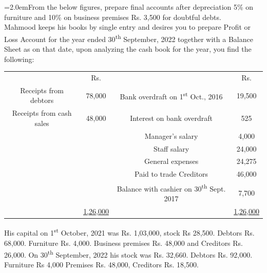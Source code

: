 \documentclass[11pt,a4paper]{article}
\newcommand{\lqn}[2]{\Needspace{6\baselineskip}\par\medskip\noindent\hangindent=2.0em\hangafter=1\makebox[2.0em][l]{\textbf{#1.}}#2\par}
\begin{document}
\lqn{13}{From the below figures, prepare final accounts after depreciation 5\% on furniture and 10\% on business premises Rs. 3,500 for doubtful debts.\\
Mahmood keeps his books by single entry and desires you to prepare Profit or Loss Account for the year ended 30\textsuperscript{th}  September, 2022 together with a Balance Sheet as on that date, upon analyzing the cash book for the year, you find the following:\par
\par\smallskip\noindent\hspace*{1.2em}\begin{tabular}{|cccc|}
\hline
 & Rs. &  & Rs. \\
Receipts from debtors & 78,000 & Bank overdraft on 1\textsuperscript{st}  Oct., 2016 & 19,500 \\
Receipts from cash sales & 48,000 & Interest on bank overdraft & 525 \\
 &  & Manager’s salary & 4,000 \\
 &  & Staff salary & 24,000 \\
 &  & General expenses & 24,275 \\
 &  & Paid to trade Creditors & 46,000 \\
 &  & Balance with cashier on 30\textsuperscript{th}  Sept. 2017 & 7,700 \\
 & \underline{1,26,000} &  & \underline{1,26,000} \\
\hline
\end{tabular}\par\smallskip
His capital on 1\textsuperscript{st}  October, 2021 was Rs. 1,03,000, stock Rs 28,500. Debtors Rs. 68,000. Furniture Rs. 4,000. Business premises Rs. 48,000 and Creditors Rs. 26,000. On 30\textsuperscript{th}  September, 2022 his stock was Rs. 32,660. Debtors Rs. 92,000. Furniture Rs 4,000 Premises Rs. 48,000, Creditors Rs. 18,500.\par
}
\end{document}

